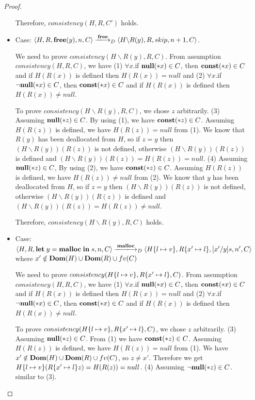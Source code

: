\begin{proof}
\begin{itemize}
    Therefore, \(consistency(H, R, C')\) holds.

  \item Case: \(\langle H, R, \Free(y), n, C \rangle \xlongrightarrow{\Free}_D
    \langle H\backslash R(y), R, skip, n+1, C  \rangle \).

    We need to prove \(consistency(H\backslash R(y), R, C)\). From
    assumption \(consistency(H, R, C)\), we have (1) \(\forall x\).if
    \({\bf null}(*x) \in C\), then \(\mathbf{const}(*x) \in C\) and if \(H(R(x))\) is
    defined then \(H(R(x)) = null\) and (2) \(\forall x\).if
    \(\neg{\bf null}(*x) \in C\), then \(\mathbf{const}(*x) \in C\) and if \(H(R(x))\) is
    defined then \(H(R(x)) \ne null\).

    To prove \(consistency(H\backslash R(y), R, C)\), we chose \(z\)
    arbitrarily. (3) Assuming \(\mathbf{null}(*z) \in C\). By using (1), we
    have \(\mathbf{const}(*z) \in C\). Assuming \(H(R(z))\) is defined, we have
    \(H(R(z)) = null\) from (1). We know that \(R(y)\) has been
    deallocated from \(H\), so if \( z = y \) then \((H\backslash
    R(y))(R(z))\) is not defined, otherwise \((H\backslash R(y))(R(z))\)
    is defined and \((H\backslash R(y))(R(z)) = H(R(z)) = null\). (4)
    Assuming \(\mathbf{null}(*z) \in C\), By using (2), we have \(\mathbf{const}(*z)
    \in C\). Assuming \(H(R(z))\) is defined, we have \(H(R(z)) \ne
    null\) from (2). We know that \(y\) has been deallocated from
    \(H\), so if \( z = y \) then \((H\backslash R(y))(R(z))\) is not
    defined, otherwise \((H\backslash R(y))(R(z))\) is defined and
    \((H\backslash R(y))(R(z)) = H(R(z)) \ne null\).

    Therefore, \(consistency(H\backslash R(y), R, C)\) holds.
        
\item Case: \(\langle H, R, \LET y = \Malloc \; \IN s, n, C \rangle
  \xlongrightarrow{\Malloc}_D \langle H\set{l \mapsto v}, R\set{x'
    \mapsto l}, [x'/y]s, n', C \rangle \) where \(x' \notin
  \mathbf{Dom}(H)\cup\mathbf{Dom}(R)\cup fv(C) \)

    We need to prove \(consistency(H\{l \mapsto v\}, R\{x'
      \mapsto l\}, C )\). From assumption \(consistency(H, R, C)\), we
    have (1) \(\forall x\).if \({\bf null}(*x) \in C\), then \(\mathbf{const}(*x) \in
    C\) and if \(H(R(x))\) is defined then \(H(R(x)) = null\) and (2)
    \(\forall x\).if \(\neg{\bf null}(*x) \in C\), then \(\mathbf{const}(*x) \in C\) and
    if \(H(R(x))\) is defined then \(H(R(x)) \ne null\).

    To prove \(consistency(H\{l \mapsto v\}, R\{x' \mapsto l\}, C
    )\), we chose \(z\) arbitrarily. (3) Assuming \(\mathbf{null}(*z) \in
    C\). From (1) we have \(\mathbf{const}(*z) \in C\). Assuming \(H(R(z))\) is
    defined, we have \(H(R(z)) = null \) from (1). We have \(x' \notin
    \mathbf{Dom}(H)\cup\mathbf{Dom}(R)\cup fv(C) \), so \(z \ne x'\). Therefore we get
    \(H\{l \mapsto v\}(R\{x' \mapsto l\}z) = H(R(z)) = null\). (4)
    Assuming \(\neg\mathbf{null}(*z) \in C\). similar to (3).
    

\end{itemize}
\end{proof}
